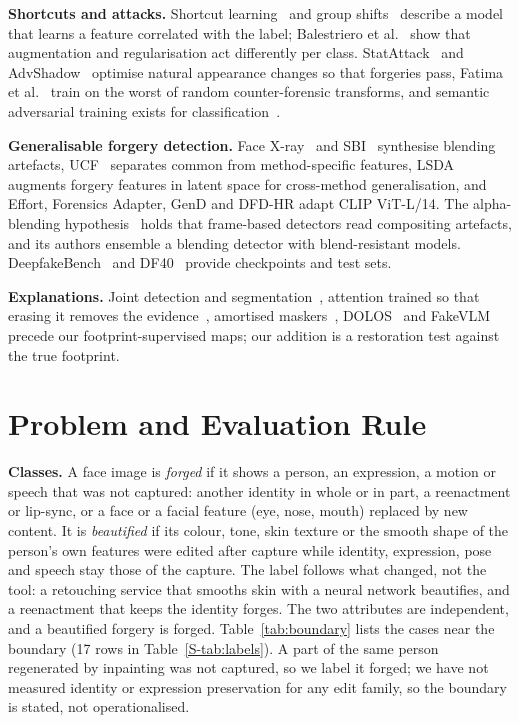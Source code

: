 \documentclass[conference]{IEEEtran}
\begin{document}
\textbf{Shortcuts and attacks.} Shortcut learning~\cite{geirhos2020} and group shifts~\cite{sagawa2020} describe a model that
learns a feature correlated with the label; Balestriero et al.~\cite{balestriero2022} show that augmentation and regularisation
act differently per class. StatAttack~\cite{statattack2023} and AdvShadow~\cite{advshadow2024} optimise natural appearance
changes so that forgeries pass, Fatima et al.~\cite{fatima2025} train on the worst of random counter-forensic transforms, and
semantic adversarial training exists for classification~\cite{hosseini2018,laidlaw2019,gat2023,ava2021}.

\textbf{Generalisable forgery detection.} Face X-ray~\cite{facexray} and SBI~\cite{sbi} synthesise blending artefacts,
UCF~\cite{ucf} separates common from method-specific features, LSDA~\cite{lsda} augments forgery features in latent space for
cross-method generalisation, and Effort, Forensics Adapter, GenD and DFD-HR adapt CLIP ViT-L/14. The alpha-blending
hypothesis~\cite{alphablend2026} holds that frame-based detectors read compositing artefacts, and its authors ensemble a
blending detector with blend-resistant models. DeepfakeBench~\cite{deepfakebench} and DF40~\cite{df40} provide checkpoints and
test sets.

\textbf{Explanations.} Joint detection and segmentation~\cite{nguyen2019multitask,hifinet2023}, attention trained so that
erasing it removes the evidence~\cite{gain}, amortised maskers~\cite{dabkowski2017,phang2020}, DOLOS~\cite{dolos} and
FakeVLM~\cite{fakevlm2025} precede our footprint-supervised maps; our addition is a restoration test against the true footprint.

\section{Problem and Evaluation Rule}
\label{sec:protocol}
\textbf{Classes.} A face image is \emph{forged} if it shows a person, an expression, a motion or speech that was not captured:
another identity in whole or in part, a reenactment or lip-sync, or a face or a facial feature (eye, nose, mouth) replaced by
new content. It
is \emph{beautified} if its colour, tone, skin texture or the smooth shape of the person's own features were edited after
capture while identity, expression, pose and speech stay those of the capture. The label follows what changed, not the tool: a
retouching service that smooths skin with a neural network beautifies, and a reenactment that keeps the identity forges. The
two attributes are independent, and a beautified forgery is forged. Table~\ref{tab:boundary} lists the cases near the boundary
(17 rows in Table~\ref{S-tab:labels}). A part of the same person regenerated by inpainting was not captured, so we label it
forged; we have not measured identity or expression preservation for any edit family, so the boundary is stated, not
operationalised.
\end{document}

